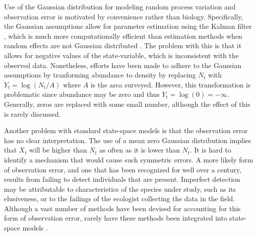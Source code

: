 \documentclass[12pt]{article}
\begin{document}
Use of the Gaussian distribution for modeling random process variation
and observation error is motivated by convenience rather than
biology. Specifically, the Gaussian assumptions
allow for parameter estimation using the Kalman filter
\citep{dennis_etal:2006}, which is much more computationally efficient
than estimation methods when random effects are not Gaussian distributed
\citep{devalpine_hastings:2002}. The problem with this is that it
allows for negative values of the state-variable, which is
inconsistent with the observed data.
Nonetheless, efforts have been made to adhere to the
Gaussian assumptions by tranforming abundance to
density by replacing $N_t$ with $Y_t = \log(N_t/A)$ where $A$ is the
area surveyed. However, this transformation is problematic since
abundance may be zero and thus $Y_t = \log(0) = -\infty$. Generally,
zeros are replaced with some small number, although the
effect of this is rarely discussed.

Another problem with standard state-space models is that the
observation error has no clear interpretation. The use of a mean zero
Gaussian distribution implies that $X_t$ will be
higher than $N_t$ as often as it is lower than $N_t$. It is hard
to identify a mechanism that would cause such symmetric errors. A more likely
form of observation error, and one that has been recognized for well
over a century, results from failing to detect individuals that are
present. Imperfect detection may be attributable to
characteristics of the species under study, such as its elusiveness,
or to the failings of the ecologist collecting the data in the field.
Although a vast number of methods have been devised for accounting for
this form of observation error, rarely have these methods been
integrated into state-space models \citep[but
see][]{buckland_etal:2004}.
\end{document}
